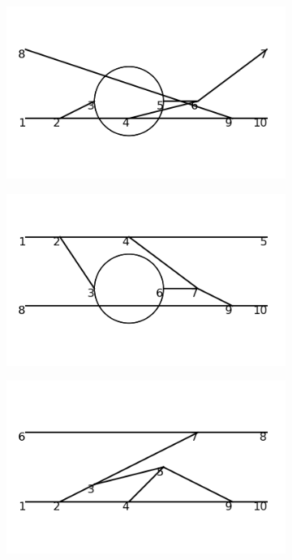 \documentclass[11pt,a4paper,twoside,pdf]{article}
\numberwithin{equation}{section}
\begin{document}
\begin{figure}[h!]
\begin{subfigure}[t]{0.16\textwidth}
    \end{subfigure}
    \hfill
    \begin{subfigure}[t]{0.16\textwidth}
        \centering
        \includegraphics[width=\textwidth]{plots/order6_2to2/30.png}
    \end{subfigure}
    \hfill
    \begin{subfigure}[t]{0.16\textwidth}
        \centering
        \includegraphics[width=\textwidth]{plots/order6_2to2/31.png}
    \end{subfigure}
    \hfill
    \begin{subfigure}[t]{0.16\textwidth}
        \centering
        \includegraphics[width=\textwidth]{plots/order6_2to2/32.png}

\end{subfigure}
\end{figure}
\end{document}
